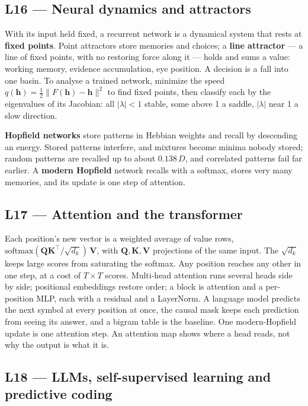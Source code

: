 \documentclass[11pt]{article}
\begin{document}
\subsection{L16 --- Neural dynamics and attractors}

With its input held fixed, a recurrent network is a dynamical system that rests
at \textbf{fixed points}. Point attractors store memories and choices; a
\textbf{line attractor} --- a line of fixed points, with no restoring force along
it --- holds and sums a value: working memory, evidence accumulation, eye
position. A decision is a fall into one basin. To analyse a trained network,
minimize the speed $q(\mathbf{h})=\tfrac12\|F(\mathbf{h})-\mathbf{h}\|^2$ to find
fixed points, then classify each by the eigenvalues of its Jacobian: all
$|\lambda|<1$ stable, some above 1 a saddle, $|\lambda|$ near 1 a slow direction.

\textbf{Hopfield networks} store patterns in Hebbian weights and recall by
descending an energy. Stored patterns interfere, and mixtures become minima
nobody stored; random patterns are recalled up to about $0.138\,D$, and correlated
patterns fail far earlier. A \textbf{modern Hopfield} network recalls with a
softmax, stores very many memories, and its update is one step of attention.

\subsection{L17 --- Attention and the transformer}

Each position's new vector is a weighted average of value rows,
$\mathrm{softmax}(\mathbf{Q}\mathbf{K}^{\!\top}/\sqrt{d_k})\,\mathbf{V}$, with
$\mathbf{Q},\mathbf{K},\mathbf{V}$ projections of the same input. The
$\sqrt{d_k}$ keeps large scores from saturating the softmax. Any position reaches
any other in one step, at a cost of $T\times T$ scores. Multi-head attention runs
several heads side by side; positional embeddings restore order; a block is
attention and a per-position MLP, each with a residual and a LayerNorm. A
language model predicts the next symbol at every position at once, the causal
mask keeps each prediction from seeing its answer, and a bigram table is the
baseline. One modern-Hopfield update is one attention step. An attention map
shows where a head reads, not why the output is what it is.

\subsection{L18 --- LLMs, self-supervised learning and predictive coding}
\end{document}
